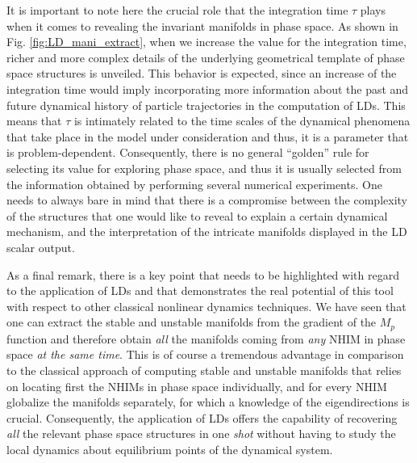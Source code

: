 \documentclass[9pt]{article}
\begin{document}
It is important to note here the crucial role that the integration time $\tau$ plays when it comes to revealing the invariant manifolds in phase space. As shown in Fig. \ref{fig:LD_mani_extract}, when we increase the value for the integration time, richer and more complex details of the underlying geometrical template of phase space structures is unveiled. This behavior is expected, since an increase of the integration time would imply incorporating more information about the past and future dynamical history of particle trajectories in the computation of LDs. This means that $\tau$ is intimately related to the time scales of the dynamical phenomena that take place in the model under consideration and thus, it is a parameter that is problem-dependent. Consequently, there is no general ``golden'' rule for selecting its value for exploring phase space, and thus it is usually selected from the information obtained by performing several numerical experiments. One needs to always bare in mind that there is a compromise between the complexity of the structures that one would like to reveal to explain a certain dynamical mechanism, and the interpretation of the intricate manifolds displayed in the LD scalar output. 




As a final remark, there is a key point that needs to be highlighted with regard to the application of LDs and that demonstrates the real potential of this tool with respect to other classical nonlinear dynamics techniques. We have seen that one can extract the stable and unstable manifolds from the gradient of the $M_p$ function and therefore obtain \textit{all} the manifolds coming from \textit{any} NHIM in phase space \textit{at the same time}. This is of course a tremendous advantage in comparison to the classical approach of computing stable and unstable manifolds that relies on locating first the NHIMs in phase space individually, and for every NHIM globalize the manifolds separately, for which a knowledge of the eigendirections is crucial. Consequently, the application of LDs offers the capability of recovering \textit{all} the relevant phase space structures in one \textit{shot} without having to study the local dynamics about equilibrium points of the dynamical system.










\end{document}
